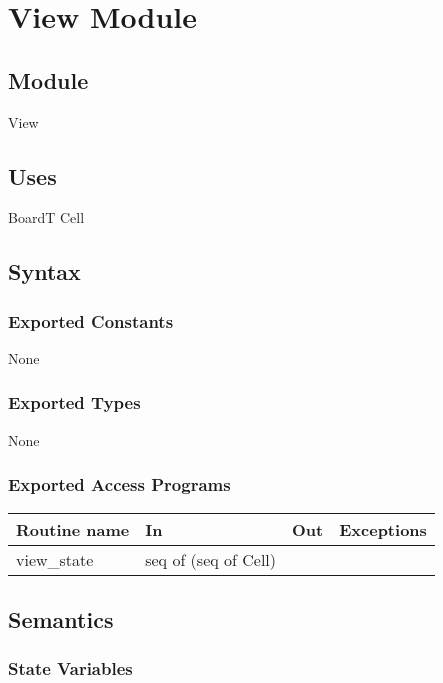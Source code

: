 \documentclass[12pt]{article}
\begin{document}
\newpage

\section* {View Module}

\subsection*{Module}

View

\subsection* {Uses}

BoardT
Cell

\subsection* {Syntax}

\subsubsection* {Exported Constants}

None

\subsubsection* {Exported Types}

None

\subsubsection* {Exported Access Programs}

\begin{tabular}{| l | l | l | p{5cm} |}
\hline
\textbf{Routine name} & \textbf{In} & \textbf{Out} & \textbf{Exceptions}\\
\hline
view\_state & seq of (seq of Cell) & &\\
\hline
\end{tabular}

\subsection* {Semantics}

\subsubsection* {State Variables}
\end{document}
